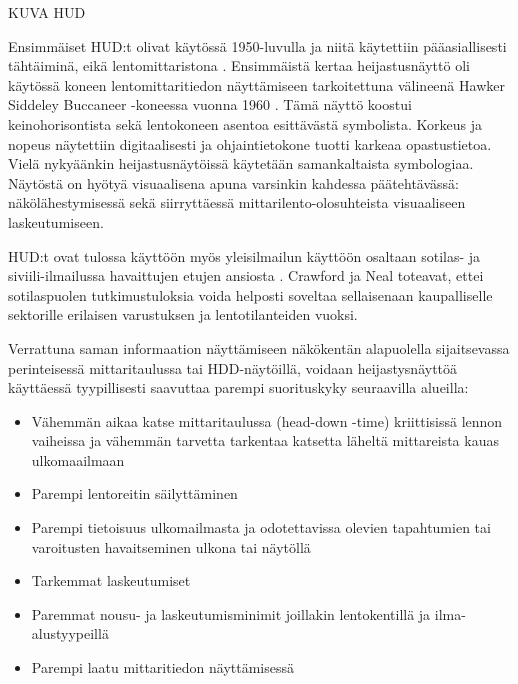 \documentclass[utf8,bachelor,manualbib]{gradu3}
\begin{document}
KUVA HUD

Ensimmäiset HUD:t olivat käytössä 1950-luvulla ja niitä käytettiin pääasiallisesti tähtäiminä, eikä lentomittaristona \citep{crawfordneal2006}. Ensimmäistä kertaa heijastusnäyttö oli käytössä koneen lentomittaritiedon näyttämiseen tarkoitettuna välineenä Hawker Siddeley Buccaneer -koneessa vuonna 1960 \citep{weintraubensing1992}. Tämä näyttö koostui keinohorisontista sekä lentokoneen asentoa esittävästä symbolista. Korkeus ja nopeus näytettiin digitaalisesti ja ohjaintietokone tuotti karkeaa opastustietoa. Vielä nykyäänkin heijastusnäytöissä käytetään samankaltaista symbologiaa. Näytöstä on hyötyä visuaalisena apuna varsinkin kahdessa päätehtävässä: näkölähestymisessä sekä siirryttäessä mittarilento-olosuhteista visuaaliseen laskeutumiseen. \citep{crawfordneal2006}

HUD:t ovat tulossa käyttöön myös yleisilmailun käyttöön osaltaan sotilas- ja siviili-ilmailussa havaittujen etujen ansiosta \citep{ververswickens1998}. Crawford ja Neal \citeyearpar{crawfordneal2006} toteavat, ettei sotilaspuolen tutkimustuloksia voida helposti soveltaa sellaisenaan kaupalliselle sektorille erilaisen varustuksen ja lentotilanteiden vuoksi.

Verrattuna saman informaation näyttämiseen näkökentän alapuolella sijaitsevassa perinteisessä mittaritaulussa tai HDD-näytöillä, voidaan heijastysnäyttöä käyttäessä tyypillisesti saavuttaa parempi suorituskyky seuraavilla alueilla:

\begin{itemize}
\item Vähemmän aikaa katse mittaritaulussa (head-down -time) kriittisissä lennon vaiheissa ja vähemmän tarvetta tarkentaa katsetta läheltä mittareista kauas ulkomaailmaan \citep{maywickens1995}
\item Parempi lentoreitin säilyttäminen \citep{fischerym1980, lauberym1982, wickenslong1995}
\item Parempi tietoisuus ulkomailmasta ja odotettavissa olevien tapahtumien tai varoitusten havaitseminen ulkona tai näytöllä \citep{faddenym2000, fischer1979, larishwickens1991, maywickens1995, wickenslong1995}
\item Tarkemmat laskeutumiset \citep{naish1964}
\item Paremmat nousu- ja laskeutumisminimit joillakin lentokentillä ja ilma-alustyypeillä \citep{crawfordneal2006}
\item Parempi laatu mittaritiedon näyttämisessä \citep{maywickens1995}
\end{itemize}
\end{document}
